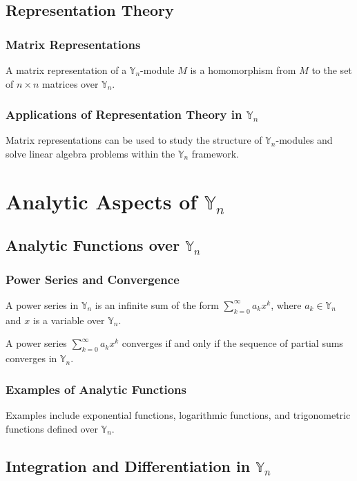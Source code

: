 \documentclass[12pt]{book}
\begin{document}
\section{Representation Theory}
\subsection{Matrix Representations}
\begin{definition}
A matrix representation of a $\mathbb{Y}_n$-module $M$ is a homomorphism from $M$ to the set of $n \times n$ matrices over $\mathbb{Y}_n$.
\end{definition}
\subsection{Applications of Representation Theory in $\mathbb{Y}_n$}
Matrix representations can be used to study the structure of $\mathbb{Y}_n$-modules and solve linear algebra problems within the $\mathbb{Y}_n$ framework.

\chapter{Analytic Aspects of $\mathbb{Y}_n$}
\section{Analytic Functions over $\mathbb{Y}_n$}
\subsection{Power Series and Convergence}
\begin{definition}
A power series in $\mathbb{Y}_n$ is an infinite sum of the form $\sum_{k=0}^{\infty} a_k x^k$, where $a_k \in \mathbb{Y}_n$ and $x$ is a variable over $\mathbb{Y}_n$.
\end{definition}
\begin{theorem}
A power series $\sum_{k=0}^{\infty} a_k x^k$ converges if and only if the sequence of partial sums converges in $\mathbb{Y}_n$.
\end{theorem}
\subsection{Examples of Analytic Functions}
Examples include exponential functions, logarithmic functions, and trigonometric functions defined over $\mathbb{Y}_n$.

\section{Integration and Differentiation in $\mathbb{Y}_n$}
\end{document}
